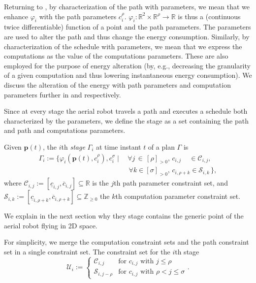 Returning to , by characterization of the path with parameters, we mean that we enhance $\varphi_i$ with the path parameters $c_i^\rho$. $\varphi_i:\mathbb{R}^2\times\mathbb{R}^\rho\rightarrow\mathbb{R}$ is thus a (continuous twice differentiable) function of a point and the path parameters. The parameters are used to alter the path and thus change the energy consumption.
Similarly, by characterization of the schedule with parameters, we mean that we express the computations as the value of the computations parameters. These are also employed for the purpose of energy alteration (by, e.g., decreasing the granularity of a given computation and thus lowering instantaneous energy consumption). We discuss the alteration of the energy with path parameters and computation parameters further in  and  respectively.

Since at every stage the aerial robot travels a path and executes a schedule both characterized by the parameters, we define the stage as a set containing the path and path and computations parameters.

\begin{highlight}  
  \begin{defn}[Stage]\label{def:stage}
    Given $\mathbf{p}(t)$, the $i$th \emph{stage} $\Gamma_i$ at time instant $t$ of a plan $\Gamma$ is
    \begin{equation*}\begin{split}
      \Gamma_i:=\{\varphi_i(\mathbf{p}(t),c_i^\rho),c_i^\sigma\mid
      \,&\forall j\,\in\,[\rho]_{>0},\,c_{i,j}\,\,\,\,\,\,\,\in\mathcal{C}_{i,j},\,\\
        &\,\forall k\in[\sigma]_{>0},\,c_{i,\rho+k}\in\mathcal{S}_{i,k}\,\},
    \end{split}\end{equation*}
    where $\mathcal{C}_{i,j}:=[\underline{c}_{i,j},\overline{c}_{i,j}]\subseteq\mathbb{R}$ is the $j$th path parameter constraint set, and $\mathcal{S}_{i,k}:=[\underline{c}_{i,\rho+k},\overline{c}_{i,\rho+k}]\subseteq\mathbb{Z}_{\geq 0}$ the $k$th computation parameter constraint set.
  \end{defn}
\end{highlight}

We explain in the next section why they stage contains the generic point of the aerial robot flying in 2D space.

For simplicity, we merge the computation constraint sets and the path constraint set in a single constraint set. The constraint set for the $i$th stage
\begin{equation}\label{eq:constraint-set}
  \mathcal{U}_i:=\begin{cases}
  \mathcal{C}_{i,j} & \text{for } c_{i,j} \text{ with } j\leq\rho\\
  \mathcal{S}_{i,j-\rho} & \text{for } c_{i,j} \text{ with } \rho<j\leq\sigma
\end{cases}.\end{equation}

